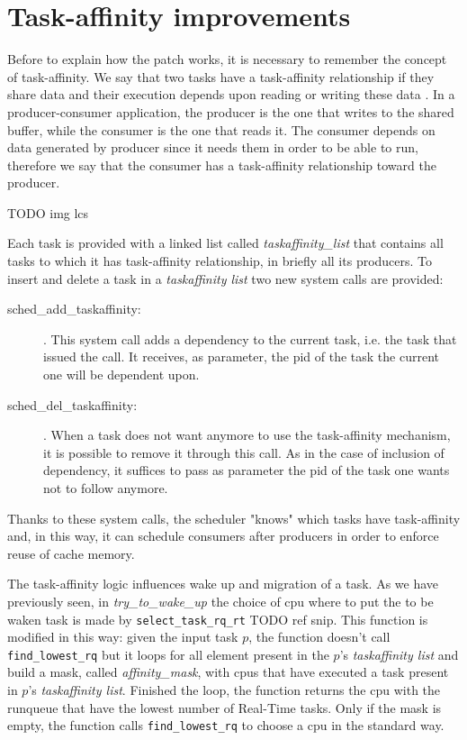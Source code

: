 \newpage

\section{Task-affinity improvements}

Before to explain how the patch works, it is necessary to remember the concept of task-affinity. We say that two tasks have a task-affinity relationship if 
they share data and their execution depends upon reading or writing these data \cite{lcs}. In a producer-consumer application, the producer 
is the one that writes to the shared buffer, while the consumer is the one that reads it. The consumer depends on data generated by producer since it needs 
them in order to be able to run, therefore we say that the consumer has a task-affinity relationship toward the producer.

TODO img lcs

Each task is provided with a linked list called \textit{taskaffinity\_list} that contains all tasks to which it has task-affinity relationship, in briefly 
all its producers. To insert and delete a task in a \textit{taskaffinity list} two new system calls are provided:

\begin{description}

\item[sched\_add\_taskaffinity:]. This system call adds a dependency to the current task, i.e. the task that issued the call. It receives, as parameter, the 
pid of the task the current one will be dependent upon.

\item[sched\_del\_taskaffinity:]. When a task does not want anymore to use the task-affinity mechanism, it is possible to remove it through this call.
As in the case of inclusion of dependency, it suffices to pass as parameter the pid of the task one wants not to follow anymore.

\end{description}

Thanks to these system calls, the scheduler "knows" which tasks have task-affinity and, in this way, it can schedule consumers after producers in order to 
enforce reuse of cache memory.

The task-affinity logic influences wake up and migration of a task. As we have previously seen, in \textit{try\_to\_wake\_up} the choice of cpu where to 
put the to be waken task is made by \texttt{select\_task\_rq\_rt} TODO ref snip. This function is modified in this way: given the input task $p$, the 
function doesn't call \texttt{find\_lowest\_rq} but it loops for all element present in the $p$'s \textit{taskaffinity list} and build a mask, called 
\textit{affinity\_mask}, with cpus that have executed a task present in $p$'s \textit{taskaffinity list}. Finished the loop, the function returns the cpu 
with the runqueue that have the lowest number of Real-Time tasks. Only if the mask is empty, the function calls \texttt{find\_lowest\_rq} to choose a cpu
in the standard way. 


